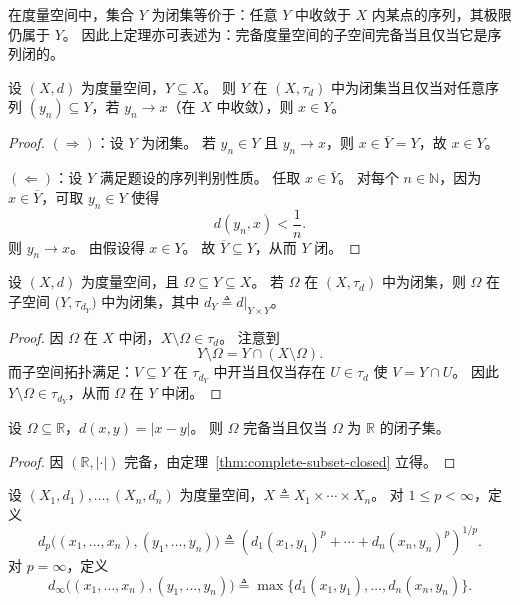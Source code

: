 \documentclass[lang=cn,a4paper,newtx,section]{elegantbook}
\begin{document}
\begin{remark}
  在度量空间中，集合 $Y$ 为闭集等价于：任意 $Y$ 中收敛于 $X$ 内某点的序列，其极限仍属于 $Y$。
  因此上定理亦可表述为：完备度量空间的子空间完备当且仅当它是序列闭的。
\end{remark}

\begin{proposition}\label{prop:closed-sequential-characterization}
  设 $(X,d)$ 为度量空间，$Y\subseteq X$。
  则 $Y$ 在 $(X,\tau_d)$ 中为闭集当且仅当对任意序列 $(y_n)\subseteq Y$，若 $y_n\to x$（在 $X$ 中收敛），则 $x\in Y$。
\end{proposition}

\begin{proof}
  $(\Rightarrow)$：设 $Y$ 为闭集。
  若 $y_n\in Y$ 且 $y_n\to x$，则 $x\in\overline{Y}=Y$，故 $x\in Y$。

  $(\Leftarrow)$：设 $Y$ 满足题设的序列判别性质。
  任取 $x\in\overline{Y}$。
  对每个 $n\in\mathbb{N}$，因为 $x\in\overline{Y}$，可取 $y_n\in Y$ 使得
  \[
    d(y_n,x)<\frac{1}{n}.
  \]
  则 $y_n\to x$。
  由假设得 $x\in Y$。
  故 $\overline{Y}\subseteq Y$，从而 $Y$ 闭。
\end{proof}

\begin{proposition}\label{prop:relative-closedness}
  设 $(X,d)$ 为度量空间，且 $\Omega\subseteq Y\subseteq X$。
  若 $\Omega$ 在 $(X,\tau_d)$ 中为闭集，则 $\Omega$ 在子空间 $\bigl(Y,\tau_{d_Y}\bigr)$ 中为闭集，其中 $d_Y\triangleq d|_{Y\times Y}$。
\end{proposition}

\begin{proof}
  因 $\Omega$ 在 $X$ 中闭，$X\setminus\Omega\in\tau_d$。
  注意到
  \[
    Y\setminus\Omega=Y\cap(X\setminus\Omega).
  \]
  而子空间拓扑满足：$V\subseteq Y$ 在 $\tau_{d_Y}$ 中开当且仅当存在 $U\in\tau_d$ 使 $V=Y\cap U$。
  因此 $Y\setminus\Omega\in\tau_{d_Y}$，从而 $\Omega$ 在 $Y$ 中闭。
\end{proof}

\begin{corollary}
  设 $\Omega\subseteq\mathbb{R}$，$d(x,y)=|x-y|$。
  则 $\Omega$ 完备当且仅当 $\Omega$ 为 $\mathbb{R}$ 的闭子集。
\end{corollary}

\begin{proof}
  因 $(\mathbb{R},|\cdot|)$ 完备，由定理~\ref{thm:complete-subset-closed} 立得。
\end{proof}

\begin{definition}
  设 $(X_1,d_1),\dots,(X_n,d_n)$ 为度量空间，$X\triangleq X_1\times\cdots\times X_n$。
  对 $1\le p<\infty$，定义
  \[
    d_p\bigl((x_1,\dots,x_n),(y_1,\dots,y_n)\bigr)
    \triangleq\left(d_1(x_1,y_1)^p+\cdots+d_n(x_n,y_n)^p\right)^{1/p}.
  \]
  对 $p=\infty$，定义
  \[
    d_\infty\bigl((x_1,\dots,x_n),(y_1,\dots,y_n)\bigr)
    \triangleq\max\{d_1(x_1,y_1),\dots,d_n(x_n,y_n)\}.
  \]
\end{definition}
\end{document}
